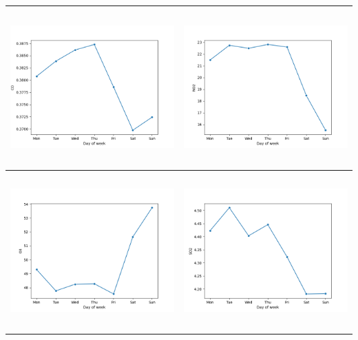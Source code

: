\documentclass[18pt, letterpaper]{article}
\begin{document}
\begin{table}[H]
\centering
\begin{tabular}{|c|c|}
\hline
\includegraphics[width=80mm,height=60mm]{visualisations/cycles/weekly_CO.png}  & \includegraphics[width=80mm,height=60mm]{visualisations/cycles/weekly_NO2.png} \\ \hline
\includegraphics[width=80mm,height=60mm]{visualisations/cycles/weekly_O3.png}  & \includegraphics[width=80mm,height=60mm]{visualisations/cycles/weekly_SO2.png} \\ \hline

\end{tabular}
\end{table}
\end{document}
